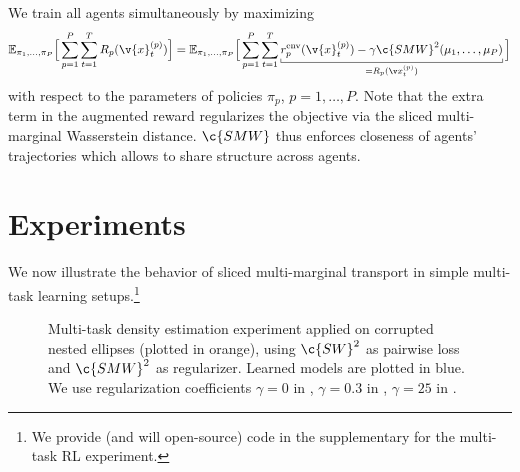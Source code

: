 \documentclass{article}
\begin{document}
We train all agents simultaneously by maximizing
\[\mathbb{E}_{\pi_1, \ldots, \pi_P}\Big[\sum_{p=1}^P\sum_{t=1}^T R_{p}(\v{x}^{(p)}_t)\Big] = \mathbb{E}_{\pi_1, \ldots, \pi_P} \Big[\sum_{p=1}^P\sum_{t=1}^T \underbracket[0.1ex]{r^{\text{env}}_{p}(\v{x}^{(p)}_t)  -\gamma\c{SMW}^2(\mu_1,\ldots, \mu_P)}_{=R_p(\v x_t^{(p)})}\Big] \label{eq:multirlobj}
\]
 with respect to the parameters of policies $\pi_p$, $p=1,\ldots,P$. 
Note that the extra term in the augmented reward regularizes the objective via the sliced multi-marginal Wasserstein distance. $\c{SMW}$ thus enforces closeness of  agents' trajectories which allows to share structure across agents. 








\section{Experiments}
We now illustrate the behavior of sliced multi-marginal transport in simple multi-task learning setups.\footnote{We provide (and will open-source) code in the supplementary for the multi-task RL experiment.}







\begin{figure}[t!]
    \centering
    \hspace{0.07cm}
    \caption{Multi-task density estimation experiment applied on corrupted nested ellipses (plotted in orange), using $\c{SW}^2$ as pairwise loss  and $\c{SMW}^2$ as regularizer. Learned models are plotted in blue. We use regularization coefficients $\gamma=0$ in , $\gamma=0.3$ in , $\gamma=25$ in .}
    \label{fig:reg_all}
\end{figure}
\end{document}
